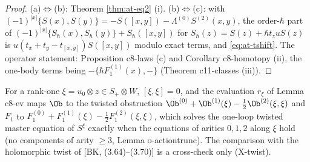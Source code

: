 \begin{proof}
(a)$\Leftrightarrow$(b): Theorem \ref{thm:at-eq2} (i). (b)$\Leftrightarrow$(c): with $(-1)^{|x|}\{S(x),S(y)\}=-S([x,y])-\Lambda^{(0)}S^{(2)}(x,y)$, the order-$\hbar$ part of $(-1)^{|x|}\{S_\hbar(x),S_\hbar(y)\}+S_\hbar([x,y])$ for $S_\hbar(z)=S(z)+\hbar t_zuS(z)$ is $u(t_x+t_y-t_{[x,y]})S([x,y])$ modulo exact terms, and \eqref{eq:at-tshift}. The operator statement: Proposition c8-laws (c) and Corollary c8-homotopy (ii), the one-body terms being $-\{\hbar F_1^{(1)}(x),-\}$ (Theorem c11-classes (iii)).
\end{proof}

\begin{remark}
\label{rem:at-twist}
For a rank-one $\xi=u_0\otimes z\in S_+\otimes W$, $[\xi,\xi]=0$, and the evaluation $r_\xi$ of Lemma c8-ev maps $\Ob$ to the twisted obstruction $\Ob^{(0)}+\Ob^{(1)}(\xi)-\tfrac12\Ob^{(2)}(\xi,\xi)$ and $F_1$ to $F_1^{(0)}+F_1^{(1)}(\xi)-\tfrac12F_1^{(2)}(\xi,\xi)$, which solves the one-loop twisted master equation of $S^\xi$ exactly when the equations of arities $0,1,2$ along $\xi$ hold (no components of arity $\ge3$, Lemma o-actiontrunc). The comparison with the holomorphic twist of [BK, (3.64)--(3.70)] is a cross-check only (X-twist).
\end{remark}
